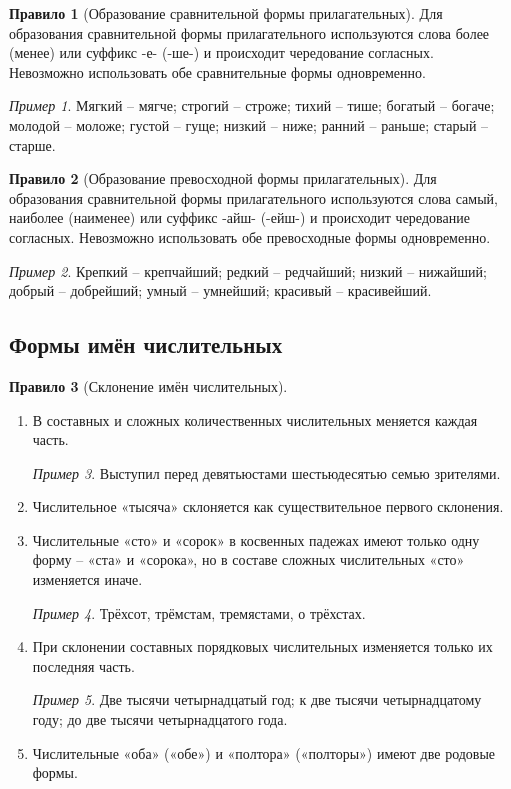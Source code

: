 \documentclass[12pt]{article}
\theoremstyle{definition}
\newtheorem{rrule}{Правило}[section]
\theoremstyle{remark}
\newtheorem*{example}{Пример}
\begin{document}
\begin{rrule}[Образование сравнительной формы прилагательных]
    Для образования сравнительной формы прилагательного используются слова более (менее) или суффикс -е- (-ше-) и происходит чередование согласных. Невозможно использовать обе сравнительные формы одновременно.
    \begin{example}
        Мягкий -- мягче; строгий -- строже; тихий -- тише; богатый -- богаче; молодой -- моложе; густой -- гуще; низкий -- ниже; ранний -- раньше; старый -- старше.
    \end{example}
\end{rrule}

\begin{rrule}[Образование превосходной формы прилагательных]
    Для образования сравнительной формы прилагательного используются слова самый, наиболее (наименее) или суффикс -айш- (-ейш-) и происходит чередование согласных. Невозможно использовать обе превосходные формы одновременно.
    \begin{example}
        Крепкий -- крепчайший; редкий -- редчайший; низкий -- нижайший; добрый -- добрейший; умный -- умнейший; красивый -- красивейший. 
    \end{example}
\end{rrule}

\subsection{Формы имён числительных}

\begin{rrule}[Склонение имён числительных]
    \hfill 
    \begin{enumerate}
        \item В составных и сложных количественных числительных меняется каждая часть.
        \begin{example}
            Выступил перед девятьюстами шестьюдесятью семью зрителями.
        \end{example}
        \item Числительное «тысяча» склоняется как существительное первого склонения.
        \item Числительные «сто» и «сорок» в косвенных падежах имеют только одну форму -- «ста» и «сорока», но в составе сложных числительных «сто» изменяется иначе.
        \begin{example}
            Трёхсот, трёмстам, тремястами, о трёхстах.
        \end{example}
        \item При склонении составных порядковых числительных изменяется только их последняя часть.
        \begin{example}
            Две тысячи четырнадцатый год; к две тысячи четырнадцатому году; до две тысячи четырнадцатого года. 
        \end{example}
        \item Числительные «оба» («обе») и «полтора» («полторы») имеют две родовые формы.
    \end{enumerate}
\end{rrule}
\end{document}
